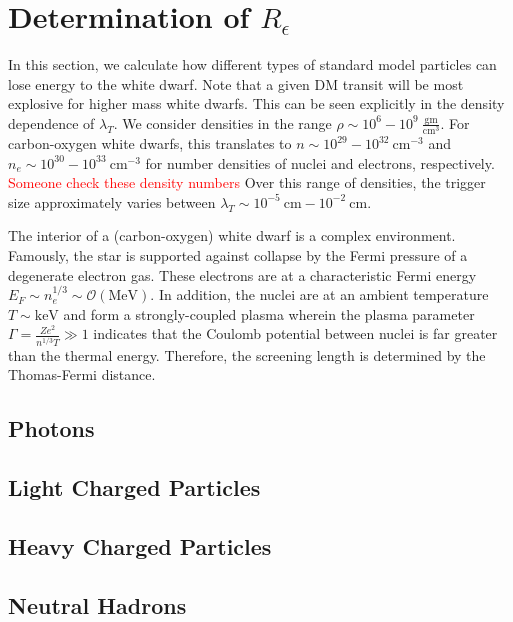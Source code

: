 \documentclass[11 pt, preprint,preprintnumbers,amsmath,amssymb, prd]{revtex4}
\newcommand{\OO}{\mathcal{O}}
\begin{document}
\section{Determination of $R_\epsilon$}
In this section, we calculate how different types of standard model particles can lose energy to the white dwarf. Note that a given DM transit will be most explosive for higher mass white dwarfs. This can be seen explicitly in the density dependence of $\lambda_T$. We consider densities in the range $\rho \sim 10^{6} - 10^{9} ~\frac{\text{gm}}{\text{cm}^3}$. For carbon-oxygen white dwarfs, this translates to $n \sim 10^{29} - 10^{32} ~\text{cm}^{-3}$ and $n_e \sim 10^{30} - 10^{33} ~\text{cm}^{-3}$ for number densities of nuclei and electrons, respectively. \textcolor{red}{Someone check these density numbers} Over this range of densities, the trigger size approximately varies between $\lambda_T \sim 10^{-5} ~\text{cm} -10^{-2} ~\text{cm}$. 

The interior of a (carbon-oxygen) white dwarf is a complex environment. Famously, the star is supported against collapse by the Fermi pressure of a degenerate electron gas. These electrons are at a characteristic Fermi energy $E_F \sim n_e^{1/3} \sim \OO(\text{MeV})$. In addition, the nuclei are at an ambient temperature $T \sim \text{keV}$ and form a strongly-coupled plasma wherein the plasma parameter $\Gamma = \frac{Z e^2}{n^{1/3} T} \gg 1$ indicates that the Coulomb potential between nuclei is far greater than the thermal energy. Therefore, the screening length is determined by the Thomas-Fermi distance. 

\subsection{Photons}

\subsection{Light Charged Particles}

\subsection{Heavy Charged Particles}

\subsection{Neutral Hadrons}
\end{document}
